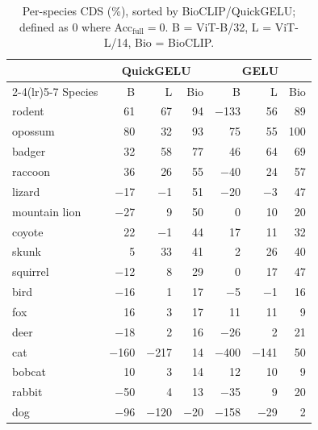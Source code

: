 \begin{table}[t]
\caption{Per-species CDS (\%), sorted by BioCLIP/QuickGELU; defined as 0 where Acc$_\text{full}=0$. B = ViT-B/32, L = ViT-L/14, Bio = BioCLIP.}
\label{tab:species}
\centering\footnotesize
\setlength{\tabcolsep}{3.5pt}
\begin{tabular}{l rrr rrr}
\toprule
 & \multicolumn{3}{c}{QuickGELU} & \multicolumn{3}{c}{GELU}\\
\cmidrule(lr){2-4}\cmidrule(lr){5-7}
Species & B & L & Bio & B & L & Bio \\
\midrule
rodent & 61 & 67 & 94 & $-$133 & 56 & 89 \\
opossum & 80 & 32 & 93 & 75 & 55 & 100 \\
badger & 32 & 58 & 77 & 46 & 64 & 69 \\
raccoon & 36 & 26 & 55 & $-$40 & 24 & 57 \\
lizard & $-$17 & $-$1 & 51 & $-$20 & $-$3 & 47 \\
mountain lion & $-$27 & 9 & 50 & 0 & 10 & 20 \\
coyote & 22 & $-$1 & 44 & 17 & 11 & 32 \\
skunk & 5 & 33 & 41 & 2 & 26 & 40 \\
squirrel & $-$12 & 8 & 29 & 0 & 17 & 47 \\
bird & $-$16 & 1 & 17 & $-$5 & $-$1 & 16 \\
fox & 16 & 3 & 17 & 11 & 11 & 9 \\
deer & $-$18 & 2 & 16 & $-$26 & 2 & 21 \\
cat & $-$160 & $-$217 & 14 & $-$400 & $-$141 & 50 \\
bobcat & 10 & 3 & 14 & 12 & 10 & 9 \\
rabbit & $-$50 & 4 & 13 & $-$35 & 9 & 20 \\
dog & $-$96 & $-$120 & $-$20 & $-$158 & $-$29 & 2 \\
\bottomrule
\end{tabular}
\end{table}
